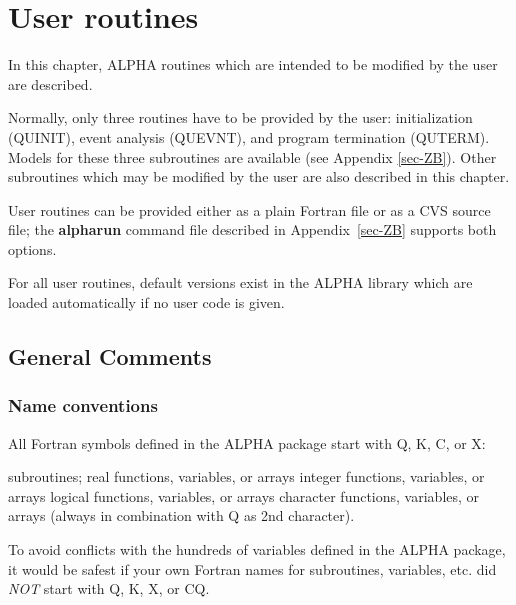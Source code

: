 \chapter{\label{sec-U}User routines}
\par
In this chapter, ALPHA routines which are intended to be modified
by the
user are described.
\par Normally, only three routines have to be provided by
the user:
initialization (QUINIT), event analysis
(QUEVNT), and program termination (QUTERM).
Models for these three subroutines are available (see Appendix
\ref{sec-ZB}).
Other subroutines which
may be modified by the user are also described in this chapter.
\par
User routines can be provided either as a plain Fortran file or as
a CVS source file; the {\bf alpharun} command file described in
Appendix~\ref{sec-ZB} supports both options. 

\par
For all user routines, default versions exist in the ALPHA library
which
are loaded automatically if no user code is given.
 
\section{\label{sec-UG}General Comments}
\par
\subsection{\label{sec-UC}Name conventions}
\par
All Fortran symbols defined in the ALPHA package start with
Q, K, C, or X:
\begin{indentlist}{ 1.00cm}{ 1.25cm}
subroutines; real functions, variables, or arrays
integer functions, variables, or arrays
logical functions, variables, or arrays
character functions, variables,
or arrays (always in combination with Q as 2nd character).
\end{indentlist}
To avoid conflicts with the hundreds of variables defined in the ALPHA
package,
it would be safest if your own Fortran names for subroutines, variables,
etc. did {\it NOT} start with Q, K, X, or CQ.
 
